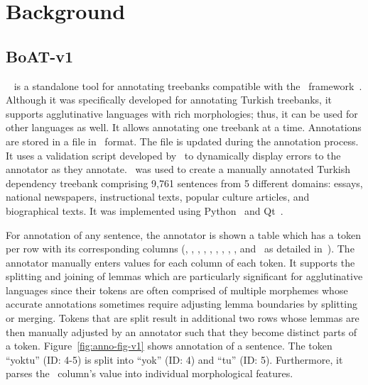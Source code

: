 \section{Background}
\label{sec:background}


\subsection{BoAT-v1}
\label{sec:boatvone}

\boatvone~\cite{anon} is a standalone tool for annotating treebanks compatible with the \ud\ framework~\cite{ud}.
Although it was specifically developed for annotating Turkish treebanks, it supports agglutinative languages with rich morphologies; thus, it can be used for other languages as well.
It allows annotating one treebank at a time.
Annotations are stored in a file in \conllu\ format.
The file is updated during the annotation process.
It uses a validation script developed by \ud\ to dynamically display errors to the annotator as they annotate.
\boatvone\ was used to create a manually annotated Turkish dependency treebank comprising 9,761 sentences from 5 different domains: essays, national newspapers, instructional texts, popular culture articles, and biographical texts.
It was implemented using Python~\cite{python} and Qt~\cite{qt}.

For annotation of any sentence, the annotator is shown a table which has a token per row with its corresponding columns (\id, \form, \udlemma, \upos, \xpos, \feats, \head, \deprel, \deps, and \misc\ as detailed in~\cite{anon}).
The annotator manually enters values for each column of each token.
It supports the splitting and joining of lemmas which are particularly significant for agglutinative languages since their tokens are often comprised of multiple morphemes whose accurate annotations sometimes require adjusting lemma boundaries by splitting or merging.
Tokens that are split result in additional two rows whose lemmas are then manually adjusted by an annotator such that they become distinct parts of a token.
Figure~\ref{fig:anno-fig-v1} shows annotation of a sentence.
The token ``yoktu'' (ID: 4-5) is split into ``yok'' (ID: 4) and ``tu'' (ID: 5).
Furthermore, it parses the \feats\ column's value into individual morphological features.

